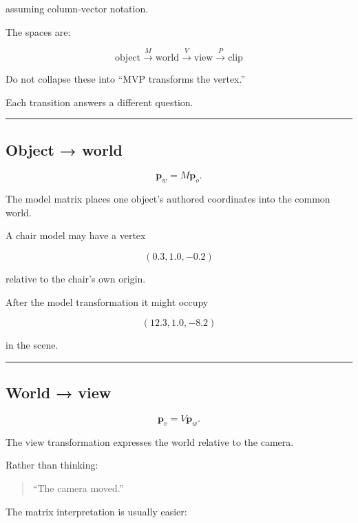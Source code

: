 assuming column-vector notation.

The spaces are:

\[
\boxed{
\text{object}
\xrightarrow{M}
\text{world}
\xrightarrow{V}
\text{view}
\xrightarrow{P}
\text{clip}
}
\]

Do not collapse these into ``MVP transforms the vertex.''

Each transition answers a different question.

\begin{center}\rule{0.5\linewidth}{0.5pt}\end{center}

\subsection{Object → world}\label{03-visual-computing-i-ch012-object-world}

\hypertarget{03-visual-computing-i-ch012-object-world}{}

\[
\mathbf p_w=M\mathbf p_o.
\]

The model matrix places one object's authored coordinates into the common world.

A chair model may have a vertex

\[
(0.3,1.0,-0.2)
\]

relative to the chair's own origin.

After the model transformation it might occupy

\[
(12.3,1.0,-8.2)
\]

in the scene.

\begin{center}\rule{0.5\linewidth}{0.5pt}\end{center}

\subsection{World → view}\label{03-visual-computing-i-ch012-world-view}

\hypertarget{03-visual-computing-i-ch012-world-view}{}

\[
\mathbf p_v=V\mathbf p_w.
\]

The view transformation expresses the world relative to the camera.

Rather than thinking:

\begin{quote}
``The camera moved.''
\end{quote}

The matrix interpretation is usually easier:

